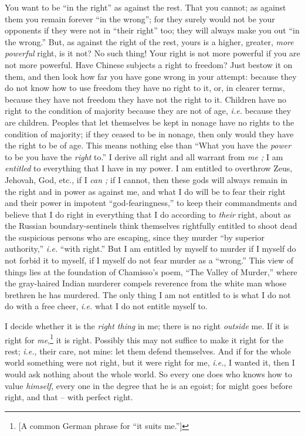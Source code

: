 You want to be ``in the right'' as against the rest. That you cannot; as 
against them you remain forever ``in the wrong''; for they surely would not 
be your opponents if they were not in ``their right'' too; they will always 
make you out ``in the wrong.'' But, as against the right of the rest, yours 
is a higher, greater, \textit{more powerful} right, is it not? No such thing! 
Your right is not more powerful if you are not more powerful. Have Chinese 
subjects a right to freedom? Just bestow it on them, and then look how far you 
have gone wrong in your attempt: because they do not know how to use freedom 
they have no right to it, or, in clearer terms, because they have not freedom 
they have not the right to it. Children have no right to the condition of 
majority because they are not of age, \textit{i.e.} because they are children. 
Peoples that let themselves be kept in nonage have no rights to the condition 
of majority; if they ceased to be in nonage, then only would they have the 
right to be of age. This means nothing else than ``What you have the 
\textit{power} to be you have the \textit{right} to.'' I derive all right and 
all warrant from \textit{me ;} I am \textit{entitled} to everything that I 
have in my power. I am entitled to overthrow Zeus, Jehovah, God, etc., if I 
\textit{can ;} if I cannot, then these gods will always remain in the right 
and in power as against me, and what I do will be to fear their right and 
their power in impotent ``god-fearingness,'' to keep their commandments and 
believe that I do right in everything that I do according to \textit{their} 
right, about as the Russian boundary-sentinels think themselves rightfully 
entitled to shoot dead the suspicious persons who are escaping, since they 
murder ``by superior authority,'' \textit{i.e.} ``with right.'' But I am 
entitled by myself to murder if I myself do not forbid it to myself, if I 
myself do not fear murder as a ``wrong.'' This view of things lies at the 
foundation of Chamisso's poem, ``The Valley of Murder,'' where the 
gray-haired Indian murderer compels reverence from the white man whose 
brethren he has murdered. The only thing I am not entitled to is what I do not 
do with a free cheer, \textit{i.e.} what I do not entitle myself to.

I decide whether it is the \textit{right thing} in me; there is no right 
\textit{outside} me. If it is right for \textit{me},\footnote{[A common German 
phrase for ``it suits me.'']} it is right. Possibly this may not suffice to 
make it right for the rest; \textit{i.e.}, their care, not mine: let them 
defend themselves. And if for the whole world something were not right, but it 
were right for me, \textit{i.e.}, I wanted it, then I would ask nothing about 
the whole world. So every one does who knows how to value \textit{himself}, 
every one in the degree that he is an egoist; for might goes before right, and 
that -- with perfect right.

